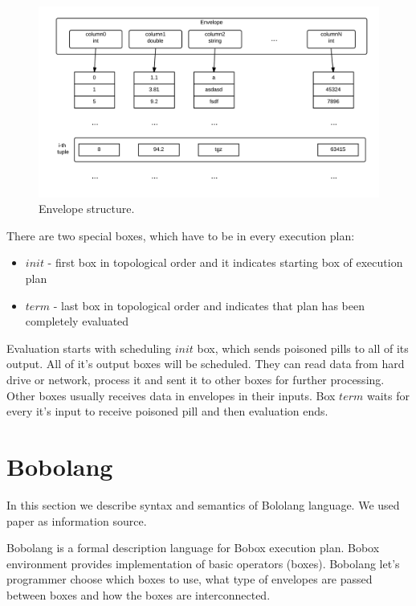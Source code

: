 \begin{figure}[h!]
  \centering
    \includegraphics[width=1\textwidth]{envelope}

      \caption{Envelope structure.}
          \label{fig:envelope}
\end{figure}
There are two special boxes, which have to be in every execution plan:
\begin{itemize}


\item $init$ - first box in topological order and it indicates starting box of execution plan

\item $term$ - last box in topological order and indicates that plan has been completely evaluated

\end{itemize}

Evaluation starts with scheduling $init$ box, which sends poisoned pills to all of its output. All of it's output boxes will be scheduled. They can read data from hard drive or network, process it and sent it to other boxes for further processing. Other boxes usually receives data in envelopes in their inputs. Box $term$ waits for every it's input to receive poisoned pill and then evaluation ends.

\section{Bobolang}
In this section we describe syntax and semantics of Bololang language. We used paper\cite{bobolang} as information source.

Bobolang is a formal description language for Bobox execution plan. Bobox environment provides implementation of basic operators (boxes). Bobolang let's programmer choose which boxes to use, what type of envelopes are passed between boxes and how the boxes are interconnected. 


